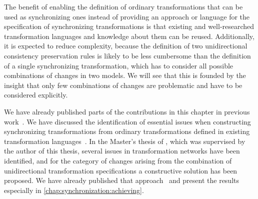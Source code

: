 
The benefit of enabling the definition of ordinary transformations that can be used as synchronizing ones instead of providing an approach or language for the specification of synchronizing transformations is that existing and well-researched transformation languages and knowledge about them can be reused.
Additionally, it is expected to reduce complexity, because the definition of two unidirectional consistency preservation rules is likely to be less cumbersome than the definition of a single synchronizing transformation, which has to consider all possible combinations of changes in two models.
We will see that this is founded by the insight that only few combinations of changes are problematic and have to be considered explicitly.

We have already published parts of the contributions in this chapter in previous work~.
We have discussed the identification of essential issues when constructing synchronizing transformations from ordinary transformations defined in existing transformation languages~.
In the Master's thesis of , which was supervised by the author of this thesis, several issues in transformation networks have been identified, and for the category of changes arising from the combination of unidirectional transformation specifications a constructive solution has been proposed.
We have already published that approach~ and present the results especially in \autoref{chap:synchronization:achieving}.





